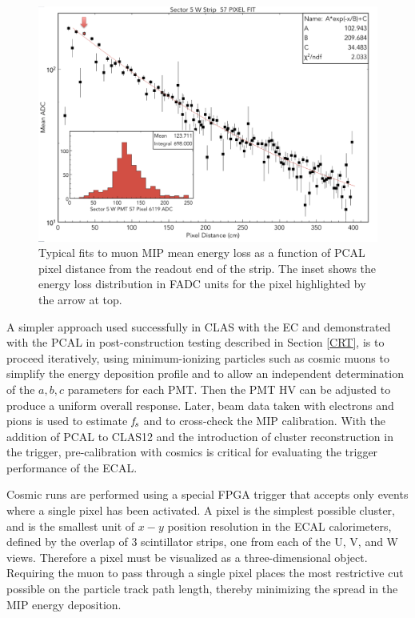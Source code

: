 \begin{figure}[hbt]
\centering
\includegraphics[width=1.0\columnwidth,keepaspectratio]{img/S9_1_2.png}
\caption[]{Typical fits to muon MIP mean energy loss as a function of PCAL pixel distance from the readout end of
  the strip. The inset shows the energy loss distribution in FADC units for the pixel highlighted by the arrow at top.}
\label{fig:S9_1_2}
\end{figure}

A simpler approach used successfully in CLAS with the EC and demonstrated with the PCAL in post-construction
testing described in Section \ref{CRT}, is to proceed iteratively, using minimum-ionizing particles such as cosmic
muons to simplify the energy deposition profile and to allow an independent determination of the $a,b,c$
parameters for each PMT. Then the PMT HV can be adjusted to produce a uniform overall response. Later, beam
data taken with electrons and pions is used to estimate ${\it f_s}$ and to cross-check the MIP calibration. With
the addition of PCAL to CLAS12 and the introduction of cluster reconstruction in the trigger, pre-calibration with
cosmics is critical for evaluating the trigger performance of the ECAL.

Cosmic runs are performed using a special FPGA trigger that accepts only events where a single pixel has been
activated. A pixel is the simplest possible cluster, and is the smallest unit of $x-y$ position resolution in the ECAL
calorimeters, defined by the overlap of 3 scintillator strips, one from each of the U, V, and W views. Therefore a
pixel must be visualized as a three-dimensional object. Requiring the muon to pass through a single pixel places the
most restrictive cut possible on the particle track path length, thereby minimizing the spread in the MIP energy
deposition.

